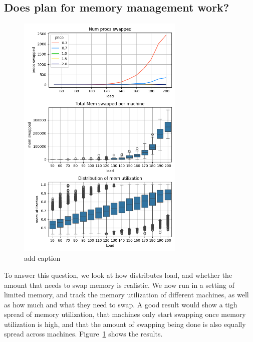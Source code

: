 \subsection{Does \sys{} plan for memory management work?}

\begin{figure}[t!]
    \centering
      \includegraphics[width=8cm]{img/memory_graphs.png}
      \caption{ add caption }
    \label{fig:memory-graphs}
\end{figure}

To answer this question, we look at how \sys{} distributes load, and whether the
amount that \sys{} needs to swap memory is realistic. We now run \sys{} in a
setting of limited memory, and track the memory utilization of different
machines, as well as how much and what they need to swap. A good result would
show a tigh spread of memory utilization, that machines only start swapping once
memory utilization is high, and that the amount of swapping being done is also
equally spread across machines. Figure~\ref{fig:memory-graphs} shows the
results.


